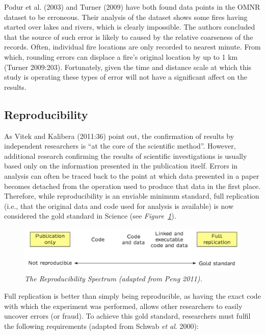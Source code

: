 \begin{spacing}{1.5}
Podur et al. (2003) and Turner (2009) have both found data points in the OMNR dataset to be erroneous. Their analysis of the dataset shows some fires having started over lakes and rivers, which is clearly impossible. The authors concluded that the source of such error is likely to caused by the relative coarseness of the records. Often, individual fire locations are only recorded to nearest minute. From which, rounding errors can displace a fire's original location by up to 1 km (Turner 2009:203). Fortunately, given the time and distance scale at which this study is operating these types of error will not have a significant affect on the results.

\subsection{Reproducibility}
As Vitek and Kalibera (2011:36) point out, the confirmation of results by independent researchers is ``at the core of the scientific method''. However, additional research confirming the results of scientific investigations is usually based only on the information presented in the publication itself. Errors in analysis can often be traced back to the point at which data presented in a paper becomes detached from the operation used to produce that data in the first place. Therefore, while reproducibility is an enviable minimum standard, full replication (i.e., that the original data and code used for analysis is available) is now considered the gold standard in Science (see \emph{Figure~\ref{fig8}}). \\

\begin{figure}[h!]
  \centering
    \includegraphics[width=.85\textwidth]{media/fig8}
      \caption[The Reproducibility Spectrum]{\emph{The Reproducibility Spectrum (adapted from Peng 2011).}}
        \label{fig8}
\end{figure}

\noindent Full replication is better than simply being reproducible, as having the exact code with which the experiment was performed, allows other researchers to easily uncover errors (or fraud). To achieve this gold standard, researchers must fulfil the following requirements (adapted from Schwab \emph{et al}. 2000):


\end{spacing}
